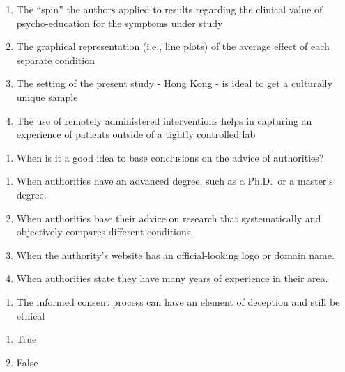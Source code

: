 \documentclass[
  12pt,
  letterpaper,
  DIV=11,
  numbers=noendperiod]{scrartcl}
\providecommand{\tightlist}{%
  \setlength{\itemsep}{0pt}\setlength{\parskip}{0pt}}\usepackage{longtable,booktabs,array}
\begin{document}
\begin{enumerate}
\def\labelenumi{\alph{enumi}.}
\tightlist
\item
  The ``spin'' the authors applied to results regarding the clinical
  value of psycho-education for the symptoms under study
\item
  The graphical representation (i.e., line plots) of the average effect
  of each separate condition
\item
  The setting of the present study - Hong Kong - is ideal to get a
  culturally unique sample
\item
  The use of remotely administered interventions helps in capturing an
  experience of patients outside of a tightly controlled lab
\end{enumerate}

\newpage{}

\begin{enumerate}
\def\labelenumi{\arabic{enumi}.}
\setcounter{enumi}{41}
\tightlist
\item
  When is it a good idea to base conclusions on the advice of
  authorities?
\end{enumerate}

\begin{enumerate}
\def\labelenumi{\alph{enumi}.}
\tightlist
\item
  When authorities have an advanced degree, such as a Ph.D.~or a
  master's degree.
\item
  When authorities base their advice on research that systematically and
  objectively compares different conditions.
\item
  When the authority's website has an official-looking logo or domain
  name.
\item
  When authorities state they have many years of experience in their
  area.
\end{enumerate}

\begin{enumerate}
\def\labelenumi{\arabic{enumi}.}
\setcounter{enumi}{42}
\tightlist
\item
  The informed consent process can have an element of deception and
  still be ethical
\end{enumerate}

\begin{enumerate}
\def\labelenumi{\alph{enumi}.}
\tightlist
\item
  True
\item
  False
\end{enumerate}
\end{document}

